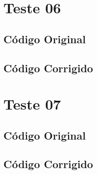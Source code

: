 \section{Teste 06}
\label{subsec:teste06}

\subsection{Código Original}


\subsection{Código Corrigido}


\section{Teste 07}
\label{subsec:teste07}

\subsection{Código Original}


\subsection{Código Corrigido}
